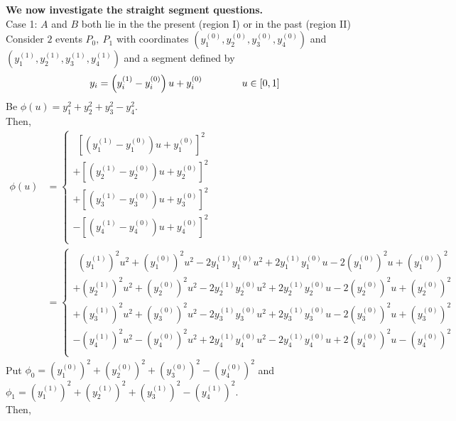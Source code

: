\textbf{We now investigate the straight segment questions.} \\
Case 1: $A$ and $B$ both lie in the the present (region I) or in the past (region II)\\
Consider $2$ events $P_0,\ P_1$ with coordinates $(y_1^{(0)},y_2^{(0)},y_3^{(0)},y_4^{(0)})$ and $(y_1^{(1)},y_2^{(1)},y_3^{(1)},y_4^{(1)})$  and a segment  defined by 
\begin{align}y_i= \left(y_i^{(1)}-y_i^{(0)}\right)u + y_i^{(0)}\quad\quad\quad\quad u\in \left[0,1\right]
\end{align}
Be $\phi(u)= y_1^2+y_2^2+y_3^2-y_4^2$.\\
Then,
 \begin{align}
\phi(u) &= \left\{\begin{array}{l} \ \ \left[\left(y_1^{(1)}-y_1^{(0)}\right)u + y_1^{(0)}\right]^2\\
+\left[\left(y_2^{(1)}-y_2^{(0)}\right)u + y_2^{(0)}\right]^2\\
+\left[\left(y_3^{(1)}-y_3^{(0)}\right)u + y_3^{(0)}\right]^2\\
-\left[\left(y_4^{(1)}-y_4^{(0)}\right)u + y_4^{(0)}\right]^2\\
\end{array}\right.\\
&= \left\{\begin{array}{l} \ \ 
\left(y_1^{(1)}\right)^2 u^2+\left(y_1^{(0)}\right)^2 u^2 - 2y_1^{(1)}y_1^{(0)}u^2 + 2y_1^{(1)}y_1^{(0)}u-  2\left(y_1^{(0)}\right)^2 u+ \left(y_1^{(0)}\right)^2\\
+\left(y_2^{(1)}\right)^2 u^2+\left(y_2^{(0)}\right)^2 u^2 - 2y_2^{(1)}y_2^{(0)}u^2 + 2y_2^{(1)}y_2^{(0)}u-  2\left(y_2^{(0)}\right)^2 u+ \left(y_2^{(0)}\right)^2\\
+\left(y_3^{(1)}\right)^2 u^2+\left(y_3^{(0)}\right)^2 u^2 - 2y_3^{(1)}y_3^{(0)}u^2 + 2y_3^{(1)}y_3^{(0)}u-  2\left(y_3^{(0)}\right)^2 u+ \left(y_3^{(0)}\right)^2\\
-\left(y_4^{(1)}\right)^2 u^2-\left(y_4^{(0)}\right)^2 u^2 + 2y_4^{(1)}y_4^{(0)}u^2 - 2y_4^{(1)}y_4^{(0)}u+  2\left(y_4^{(0)}\right)^2 u- \left(y_4^{(0)}\right)^2\\
\end{array}\right.
\end{align}
Put $\phi_0 = \left(y_1^{(0)}\right)^2+\left(y_2^{(0)}\right)^2+\left(y_3^{(0)}\right)^2-\left(y_4^{(0)}\right)^2$ and $\phi_1 = \left(y_1^{(1)}\right)^2+\left(y_2^{(1)}\right)^2+\left(y_3^{(1)}\right)^2-\left(y_4^{(1)}\right)^2$. \\
Then,
